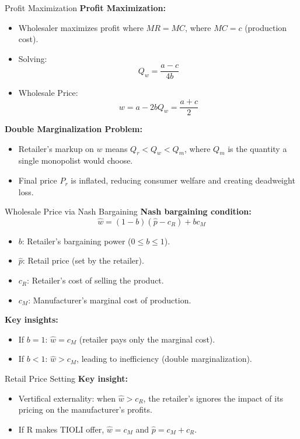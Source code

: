 \documentclass[aspectratio=169]{beamer}  %
\begin{document}
\begin{frame}{Profit Maximization}
    \textbf{Profit Maximization:}
    \begin{itemize}
        \item Wholesaler maximizes profit where \( MR = MC \), where \( MC = c \) (production cost).
        \item Solving:
        \[
        Q_w = \frac{a - c}{4b}
        \]
        \item Wholesale Price:
        \[
        w = a - 2bQ_w = \frac{a + c}{2}
        \]
    \end{itemize}

    \textbf{Double Marginalization Problem:}
    \begin{itemize}
        \item Retailer’s markup on \( w \) means \( Q_r < Q_w < Q_m \), where \( Q_m \) is the quantity a single monopolist would choose.
        \item Final price \( P_r \) is inflated, reducing consumer welfare and creating deadweight loss.
    \end{itemize}
\end{frame}
\begin{frame}{Wholesale Price via Nash Bargaining}
    \textbf{Nash bargaining condition:}
    \[
    \hat{w} = (1-b)(\hat{p} - c_R) + b c_M
    \]
    \begin{itemize}
        \item \(b\): Retailer's bargaining power (\(0 \leq b \leq 1\)).
        \item \(\hat{p}\): Retail price (set by the retailer).
        \item \(c_R\): Retailer's cost of selling the product.
        \item \(c_M\): Manufacturer's marginal cost of production.
    \end{itemize}
    \vspace{0.5cm}
    \textbf{Key insights:}
    \begin{itemize}
        \item If \(b = 1\): \(\hat{w} = c_M\) (retailer pays only the marginal cost).
        \item If \(b < 1\): \(\hat{w} > c_M\), leading to inefficiency (double marginalization).
    \end{itemize}
\end{frame}

\begin{frame}{Retail Price Setting}
    \textbf{Key insight:}
    \begin{itemize}
        \item Vertifical externality: when $\hat{w} > c_R$, the retailer's ignores the impact of its pricing on the manufacturer's profits.
        \item If R makes TIOLI offer, $\hat{w} = c_M$ and $\hat{p} = c_M + c_R$.
    \end{itemize}
\end{frame}
\end{document}
